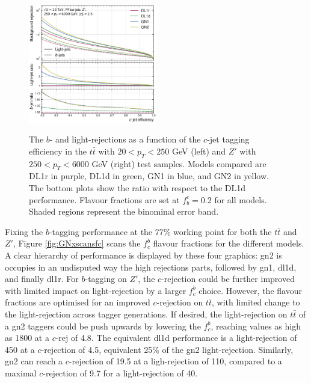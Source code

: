 \begin{center}
\begin{figure}[h!]
{  \includegraphics[width=0.50\textwidth]{Images/FTAG/GN/GN2/rocs/roc_zp_c.png}
  }
  \caption{The $b$- and light-rejections as a function of the $c$-jet tagging efficiency in the $t\bar{t}$ with $20 < p_T < 250$ GeV (left) and $Z'$ with $250 < p_T < 6000$ GeV (right) test samples. Models compared are DL1r in purple, DL1d in green, GN1 in blue, and GN2 in yellow. The bottom plots show the ratio with respect to the DL1d performance. Flavour fractions are set at $f^c_b = 0.2$ for all models. Shaded regions represent the binominal error band.}
  \label{fig:GN2rocc}
  \end{figure}
\end{center}

Fixing the $b$-tagging performance at the 77\% working point for both the $t\bar{t}$ and $Z'$, Figure \ref{fig:GNxscansfc} scans the $f^b_c$ flavour fractions for the different models. A clear hierarchy of performance is displayed by these four graphics: \gls{gn2} is occupies in an undisputed way the high rejections parts, followed by \gls{gn1}, \gls{dl1d}, and finally \gls{dl1r}. For $b$-tagging on $Z'$, the $c$-rejection could be further improved with limited impact on light-rejection by a larger $f^b_c$ choice. However, the flavour fractions are optimised for an improved $c$-rejection on $t\bar{t}$, with limited change to the light-rejection across tagger generations. If desired, the light-rejection on $t\bar{t}$ of a \gls{gn2} taggers could be push upwards by lowering the $f^b_c$, reaching values as high as 1800 at a $c$-rej of 4.8. The equivalent \gls{dl1d} performance is a light-rejection of 450 at a $c$-rejection of 4.5, equivalent 25\% of the \gls{gn2} light-rejection. Similarly, \gls{gn2} can reach a $c$-rejection of 19.5 at a ligh-rejection of 110, compared to a maximal $c$-rejection of 9.7 for a light-rejection of 40. \\


